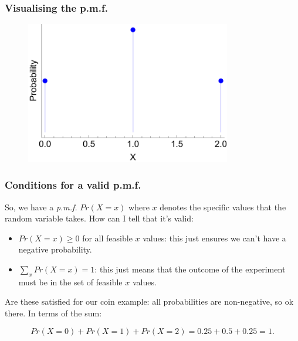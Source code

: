 \documentclass{beamer}
\begin{document}
	\begin{frame}
		\frametitle{Visualising the p.m.f.}
		
		\begin{figure}[ht]
			\includegraphics[width=0.8\textwidth]{./figures/binomial.pdf}
		\end{figure}
		
	\end{frame}
	
	\begin{frame}
		\frametitle{Conditions for a valid p.m.f.}
		
		So, we have a \textit{p.m.f.} $Pr(X=x)$ where $x$ denotes the specific values that the random variable takes. How can I tell that it's valid:
		
		\begin{itemize}
			\item $Pr(X=x) \geq 0$ for all feasible $x$ values: this just ensures we can't have a negative probability.
			\item $\sum_{x} Pr(X=x) = 1$: this just means that the outcome of the experiment must be in the set of feasible $x$ values.
		\end{itemize}
		
		Are these satisfied for our coin example: all probabilities are non-negative, so ok there. In terms of the sum:
		
		\begin{equation}
		Pr(X=0) + Pr(X=1) + Pr(X=2) = 0.25 + 0.5 + 0.25 = 1.
		\end{equation}
		
	\end{frame}
	
\end{document}
